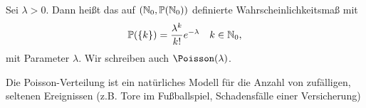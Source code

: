 \begin{definition}
	Sei $\lambda >0$. Dann heißt das auf $(\mathbb{N}_{0}, \mathbb{P}(\mathbb{N}_{0}))$ definierte Wahrscheinlichkeitsmaß mit
	\begin{equation*}
		\mathbb{P}(\left\{ k \right\}) = \frac{\lambda^k}{k!}e^{-\lambda} \quad k \in \mathbb{N}_{0},\notag
	\end{equation*}
	 mit Parameter $\lambda$. Wir schreiben auch $\Poisson(\lambda)$.
\end{definition}

Die Poisson-Verteilung ist ein natürliches Modell für die Anzahl von zufälligen, seltenen Ereignissen (z.B. Tore im Fußballspiel, Schadensfälle einer Versicherung)
